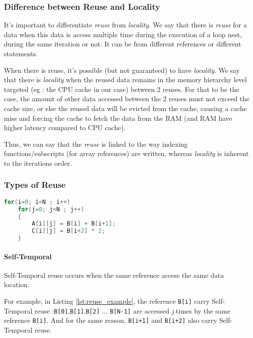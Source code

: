 \documentclass[paper=a4, fontsize=11.5pt]{scrartcl}
\numberwithin{equation}{section}        %
\numberwithin{figure}{section}          %
\numberwithin{table}{section}               %
\begin{document}
        \subsubsection{Difference between Reuse and Locality}
            It's important to differentiate \textit{reuse} from \textit{locality}.
            We say that there is \textit{reuse} for a data when this data is
            access multiple time during the execution of a loop nest, during
            the same iteration or not. It can be from different references or different statements.
            
            When there is reuse, it's possible (but not guaranteed) to have
            \textit{locality}. We say that there is \textit{locality} when the
            reused data remains in the memory hierarchy level targeted 
            (eg : the CPU cache in our case) between 2 reuses.
            For that to be the case, the amount of other data accessed between the
            2 reuses must not exceed the cache size, or else the reused data will be
            evicted from the cache, causing a cache miss and forcing the cache
            to fetch the data from the RAM (and RAM have higher latency compared to CPU cache).


            Thus, we can say that the \textit{reuse} is linked to the way indexing
            functions/subscripts (for array references) are written, whereas \textit{locality} is
            inherent to the iterations order.

\medskip

        \subsubsection{Types of Reuse}
            
\begin{lstlisting}[frame=single, language=C, caption=Reuse example, label={lst:reuse_example}]
for(i=0; i<N ; i++)
    for(j=0; j<N ; j++)
    {
        A[i][j] = B[i] + B[i+1];
        C[i][j] = B[i+2] * 2;
    }
\end{lstlisting}

            \paragraph{Self-Temporal}
                Self-Temporal reuse occurs when the same reference access the same
                data location.
                
                For example, in Listing \ref{lst:reuse_example}, the reference \verb'B[i]' carry Self-Temporal
                reuse :\verb'B[0]',\verb'B[1]',\verb'B[2]' ... \verb'B[N-1]' are accessed
                \textit{j} times by the same reference \verb'B[i]'.
                And for the same reason, \verb'B[i+1]' and \verb'B[i+2]' also carry Self-Temporal reuse.
\end{document}
